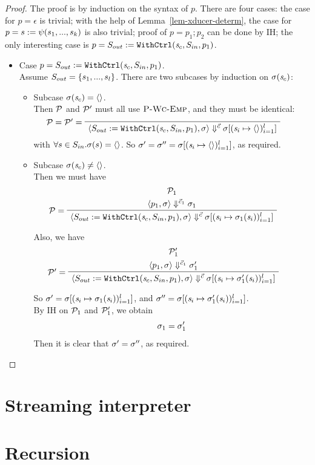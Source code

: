 \begin{proof}
	The proof is by induction on the syntax of $p$. There are four cases: the case for $p = \epsilon$ is trivial; with the help of Lemma~\ref{lem-xducer-determ}, the case for $p = s := \psi(s_1,...,s_k)$ is also trivial; proof of $p = p_1; p_2$ can be done by IH; the only interesting case is $p = S_{out} := \mathtt{WithCtrl}(\mathit{s}_c,S_{in},p_1)$.
	\begin{itemize}
		\item Case $p = S_{out} := \mathtt{WithCtrl}(\mathit{s}_c,S_{in},p_1)$. \\
		Assume $S_{out} = \{s_1,...,s_l\}$. There are two subcases by induction on $\sigma(\mathit{s}_c)$: 
		\begin{itemize}
			\item Subcase $\sigma(\mathit{s}_c) = \langle \rangle$. \\
			Then $\mathcal{P}$ and $\mathcal{P}'$ must all use $\textsc{P-Wc-Emp}$, and they must be identical:		
			$$\PT{ 
				\LeLa{\MP= \MP' =}
				\Axiom{\seval{\withctrl{\s_c}{p_1}{\Sin}{\Sout}}{\sgm}{\c}{\sgm[\l{\s_i \|-> \emptyv}]}}
			}$$
		    with $ \forall s \in S_{in}. \sigma(s) = \langle \rangle$.
		    So $\sgm' = \sgm'' = \sgm[\l{\s_i \|-> \emptyv}]$, as required. 
		    
		    \item Subcase $\sigma(\mathit{s}_c) \neq \langle \rangle$. \\
		    Then we must have
			$$\PT{
				\UCN{\MP_1}{\seval{p_1}{\sgm}{\c_1}{\sgm_1}}
				\LeLa{\MP = }
				\UC{\seval{\withctrl{\s_c}{p_1}{\Sin}{\Sout}}{\sgm}{\c}{\sgm[\l{\s_i \|-> \sgm_1(\s_i)}]}}
			}$$
		
			Also, we have
			$$\PT{
				\UCN{\MP'_1}{\seval{p_1}{\sgm}{\c_1}{\sgm'_1}}
				\LeLa{\MP' = }
				\UC{\seval{\withctrl{\s_c}{p_1}{\Sin}{\Sout}}{\sgm}{\c}{\sgm[\l{\s_i \|-> \sgm'_1(\s_i)}]}}
			}$$
		
			So $\sgm' = \sgm[\l{\s_i \|-> \sgm_1(\s_i)}]$, 
			and $\sgm'' = \sgm[\l{\s_i \|-> \sgm'_1(\s_i)}]$. \\
			By IH on $\mathcal{P}_1$ and $\mathcal{P}'_1$, we obtain
			$$\sigma_1 = \sigma_1'$$
			Then it is clear that $\sigma' = \sigma''$, as required.
			
		\end{itemize} 
		
	\end{itemize}

\end{proof}


\section{Streaming interpreter}

\section{Recursion}




